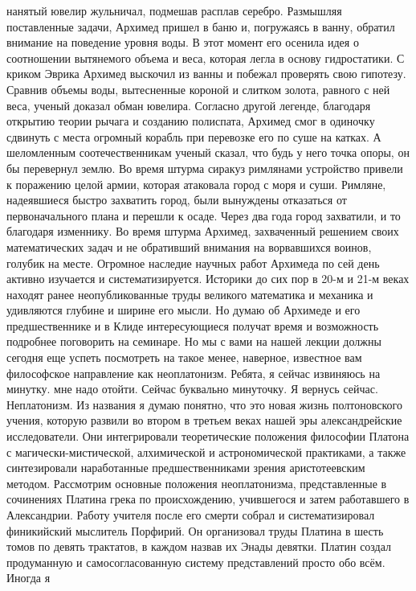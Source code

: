 нанятый ювелир жульничал, подмешав расплав серебро. Размышляя поставленные
задачи, Архимед пришел в баню и, погружаясь в ванну, обратил внимание на
поведение уровня воды. В этот момент его осенила идея о соотношении вытянемого
объема и веса, которая легла в основу гидростатики. С криком Эврика Архимед
выскочил из ванны и побежал проверять свою гипотезу. Сравнив объемы воды,
вытесненные короной и слитком золота, равного с ней веса, ученый доказал обман
ювелира. Согласно другой легенде, благодаря открытию теории рычага и созданию
полиспата, Архимед смог в одиночку сдвинуть с места огромный корабль при
перевозке его по суше на катках. А шеломленным соотечественникам ученый сказал,
что будь у него точка опоры, он бы перевернул землю. Во время штурма сиракуз
римлянами устройство привели к поражению целой армии, которая атаковала город с
моря и суши. Римляне, надеявшиеся быстро захватить город, были вынуждены
отказаться от первоначального плана и перешли к осаде. Через два года город
захватили, и то благодаря изменнику. Во время штурма Архимед, захваченный
решением своих математических задач и не обративший внимания на ворвавшихся
воинов, голубик на месте. Огромное наследие научных работ Архимеда по сей день
активно изучается и систематизируется. Историки до сих пор в 20-м и 21-м веках
находят ранее неопубликованные труды великого математика и механика и удивляются
глубине и ширине его мысли. Но думаю об Архимеде и его предшественнике и в Клиде
интересующиеся получат время и возможность подробнее поговорить на семинаре. Но
мы с вами на нашей лекции должны сегодня еще успеть посмотреть на такое менее,
наверное, известное вам философское направление как неоплатонизм. Ребята, я
сейчас извиняюсь на минутку. мне надо отойти. Сейчас буквально минуточку. Я
вернусь сейчас. Неплатонизм. Из названия я думаю понятно, что это новая жизнь
полтоновского учения, которую развили во втором в третьем веках нашей эры
александрейские исследователи. Они интегрировали теоретические положения
философии Платона с магически-мистической, алхимической и астрономической
практиками, а также синтезировали наработанные предшественниками зрения
аристотеевским методом. Рассмотрим основные положения неоплатонизма,
представленные в сочинениях Платина грека по происхождению, учившегося и затем
работавшего в Александрии. Работу учителя после его смерти собрал и
систематизировал финикийский мыслитель Порфирий. Он организовал труды Платина в
шесть томов по девять трактатов, в каждом назвав их Энады девятки. Платин создал
продуманную и самосогласованную систему представлений просто обо всём. Иногда я
